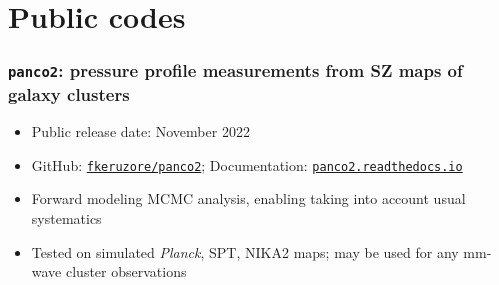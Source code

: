 \section{Public codes}

\subsubsection{\texttt{panco2}: pressure profile measurements from SZ maps of galaxy clusters}

\vspace{5pt}
\begin{itemize}[leftmargin=20pt]
    \setlength{\itemsep}{0pt}
    \item Public release date: November 2022
    \item GitHub: \href{https://github.com/fkeruzore/panco2}{\texttt{fkeruzore/panco2}}; Documentation: \href{https://panco2.readthedocs.io/en/latest/}{\texttt{panco2.readthedocs.io}}
    \item Forward modeling MCMC analysis, enabling taking into account usual systematics
    \item Tested on simulated \textit{Planck}, SPT, NIKA2 maps; may be used for any mm-wave cluster observations
\end{itemize} 
